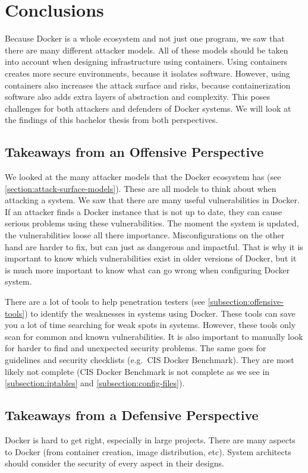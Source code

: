 \chapter{Conclusions}
Because Docker is a whole ecosystem and not just one program, we saw that there are many different attacker models. All of these models should be taken into account when designing infrastructure using containers. Using containers creates more secure environments, because it isolates software. However, using containers also increases the attack surface and risks, because containerization software also adds extra layers of abstraction and complexity. This poses challenges for both attackers and defenders of Docker systems. We will look at the findings of this bachelor thesis from both perspectives.

\section{Takeaways from an Offensive Perspective}
We looked at the many attacker models that the Docker ecosystem has (see \autoref{section:attack-surface-models}). These are all models to think about when attacking a system. We saw that there are many useful vulnerabilities in Docker. If an attacker finds a Docker instance that is not up to date, they can cause serious problems using these vulnerabilities. The moment the system is updated, the vulnerabilities loose all there importance. Misconfigurations on the other hand are harder to fix, but can just as dangerous and impactful. That is why it is important to know which vulnerabilities exist in older versions of Docker, but it is much more important to know what can go wrong when configuring Docker system.

\medskip

There are a lot of tools to help penetration testers (see \autoref{subsection:offensive-tools}) to identify the weaknesses in systems using Docker. These tools can save you a lot of time searching for weak spots in systems. However, these tools only scan for common and known vulnerabilities. It is also important to manually look for harder to find and unexpected security problems.
The same goes for guidelines and security checklists (e.g.\ CIS Docker Benchmark). They are most likely not complete (CIS Docker Benchmark is not complete as we see in \autoref{subsection:iptables} and \autoref{subsection:config-files}).

\section{Takeaways from a Defensive Perspective}
Docker is hard to get right, especially in large projects. There are many aspects to Docker (from container creation, image distribution, etc). System architects should consider the security of every aspect in their designs.

